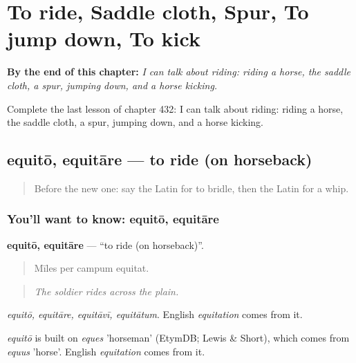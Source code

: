 
\chapter{To ride, Saddle cloth, Spur, To jump down, To kick}
\label{ch:la-to-ride-saddle-cloth-spur-to-jump-down-to-kick}

\begin{chapteropening}
\textbf{By the end of this chapter:} \emph{I can talk about riding: riding a horse, the saddle cloth, a spur, jumping down, and a horse kicking.}

Complete the last lesson of chapter 432: I can talk about riding: riding a horse, the saddle cloth, a spur, jumping down, and a horse kicking.
\end{chapteropening}

\section[equitō, equitāre]{equitō, equitāre — to ride (on horseback)}

\label{lesson:LA-C432-equito}



\begin{quote}
Before the new one: say the Latin for to bridle, then the Latin for a whip.
\end{quote}

\subsection*{You'll want to know: equitō, equitāre}
\textbf{equitō, equitāre} — \textquotedblleft{}to ride (on horseback)\textquotedblright{}.

\begin{quote}
Mīles per campum equitat.
\end{quote}

\begin{quote}
\emph{The soldier rides across the plain.}
\end{quote}

\emph{equitō, equitāre, equitāvī, equitātum}. English \emph{equitation} comes from it.

\begin{cousinweb}
\emph{equitō} is built on \emph{eques} 'horseman' (EtymDB; Lewis \& Short), which comes from \emph{equus} 'horse'. English \emph{equitation} comes from it.
\end{cousinweb}

